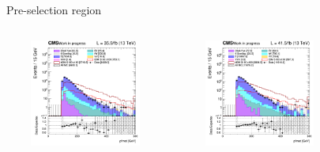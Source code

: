 \documentclass[8pt]{beamer}
\begin{document}
\begin{frame}{Pre-selection region}
\begin{columns}
\end{columns} \vspace{-5pt}
\begin{columns}
		\begin{column}{0.33\textwidth}
			\begin{center}
			\vspace{-8pt}
			\begin{block}{}\end{block}\vspace{10pt}
     			\includegraphics[width=1.0\textwidth, height=100pt]{figs/2016/SmearSR-ttDM-scalar100/log_cratio_topCR_ll_METcorrected_pt.png}
    		\end{center}		
		\end{column} 
		\begin{column}{0.33\textwidth}
			\begin{center}
			\vspace{-8pt}
			\begin{block}{}\end{block}\vspace{10pt}
     			\includegraphics[width=1.0\textwidth, height=100pt]{figs/2017/SmearSR-ttDM-scalar100/log_cratio_topCR_ll_METcorrected_pt.png}
    		\end{center}		
		\end{column} 
		\begin{column}{0.33\textwidth}

\end{column}
\end{columns}
\end{frame}
\end{document}
